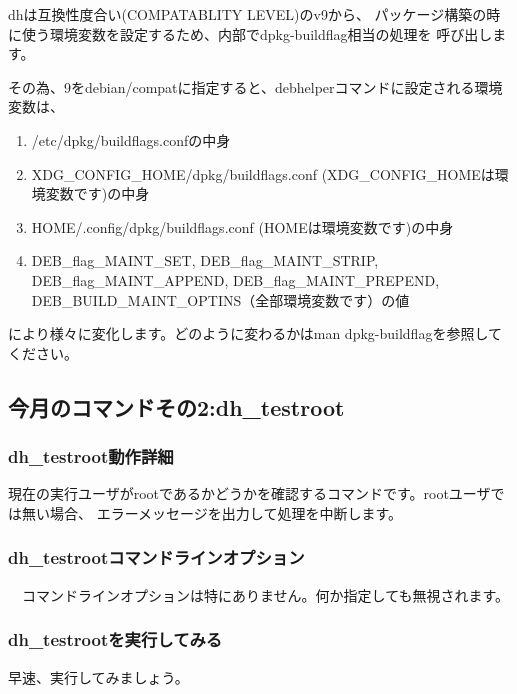 \documentclass[mingoth,a4paper]{jsarticle}
\begin{document}
dhは互換性度合い(COMPATABLITY LEVEL)のv9から、
パッケージ構築の時に使う環境変数を設定するため、内部でdpkg-buildflag相当の処理を
呼び出します。

その為、9をdebian/compatに指定すると、debhelperコマンドに設定される環境変数は、
\begin{enumerate}
\item /etc/dpkg/buildflags.confの中身
\item XDG\_CONFIG\_HOME/dpkg/buildflags.conf (XDG\_CONFIG\_HOMEは環境変数です)の中身
\item HOME/.config/dpkg/buildflags.conf (HOMEは環境変数です)の中身
\item DEB\_flag\_MAINT\_SET, DEB\_flag\_MAINT\_STRIP, DEB\_flag\_MAINT\_APPEND, DEB\_flag\_MAINT\_PREPEND, DEB\_BUILD\_MAINT\_OPTINS（全部環境変数です）の値
\end{enumerate}
により様々に変化します。どのように変わるかはman dpkg-buildflagを参照してください。

\subsection{今月のコマンドその2:dh\_testroot}

\subsubsection{dh\_testroot動作詳細}

 現在の実行ユーザがrootであるかどうかを確認するコマンドです。rootユーザでは無い場合、
エラーメッセージを出力して処理を中断します。

\subsubsection{dh\_testrootコマンドラインオプション}

　コマンドラインオプションは特にありません。何か指定しても無視されます。

\subsubsection{dh\_testrootを実行してみる}

早速、実行してみましょう。

\end{document}

